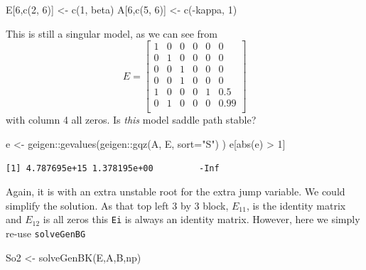 \documentclass[
  letterpaper,
]{book}
\newenvironment{Shaded}{\begin{snugshade}}{\end{snugshade}}
\newcommand{\AttributeTok}[1]{\textcolor[rgb]{0.40,0.45,0.13}{#1}}
\newcommand{\DecValTok}[1]{\textcolor[rgb]{0.68,0.00,0.00}{#1}}
\newcommand{\FunctionTok}[1]{\textcolor[rgb]{0.28,0.35,0.67}{#1}}
\newcommand{\NormalTok}[1]{\textcolor[rgb]{0.00,0.23,0.31}{#1}}
\newcommand{\OtherTok}[1]{\textcolor[rgb]{0.00,0.23,0.31}{#1}}
\newcommand{\SpecialCharTok}[1]{\textcolor[rgb]{0.37,0.37,0.37}{#1}}
\newcommand{\StringTok}[1]{\textcolor[rgb]{0.13,0.47,0.30}{#1}}
\begin{document}
\begin{Shaded}
\begin{Highlighting}[]
\NormalTok{E[}\DecValTok{6}\NormalTok{,}\FunctionTok{c}\NormalTok{(}\DecValTok{2}\NormalTok{, }\DecValTok{6}\NormalTok{)]     }\OtherTok{\textless{}{-}} \FunctionTok{c}\NormalTok{(}\DecValTok{1}\NormalTok{, beta)}
\NormalTok{A[}\DecValTok{6}\NormalTok{,}\FunctionTok{c}\NormalTok{(}\DecValTok{5}\NormalTok{, }\DecValTok{6}\NormalTok{)]     }\OtherTok{\textless{}{-}} \FunctionTok{c}\NormalTok{(}\SpecialCharTok{{-}}\NormalTok{kappa, }\DecValTok{1}\NormalTok{)}
\end{Highlighting}
\end{Shaded}

This is still a singular model, as we can see from \[  
E = \left[\begin{matrix}1 &0 &0 &0 &0 &0 \\0 &1 &0 &0 &0 &0 \\0 &0 &1 &0 &0 &0 \\0 &0 &1 &0 &0 &0 \\1 &0 &0 &0 &1 &0.5 \\0 &1 &0 &0 &0 &0.99 \\\end{matrix}\right] 
\] with column 4 all zeros. Is \emph{this} model saddle path stable?

\begin{Shaded}
\begin{Highlighting}[]
\NormalTok{e }\OtherTok{\textless{}{-}}\NormalTok{ geigen}\SpecialCharTok{::}\FunctionTok{gevalues}\NormalTok{(geigen}\SpecialCharTok{::}\FunctionTok{gqz}\NormalTok{(A, E, }\AttributeTok{sort=}\StringTok{"S"}\NormalTok{) )}
\NormalTok{e[}\FunctionTok{abs}\NormalTok{(e) }\SpecialCharTok{\textgreater{}} \DecValTok{1}\NormalTok{]}
\end{Highlighting}
\end{Shaded}

\begin{verbatim}
[1] 4.787695e+15 1.378195e+00         -Inf
\end{verbatim}

Again, it is with an extra unstable root for the extra jump variable. We
could simplify the solution. As that top left 3 by 3 block, \(E_{11}\),
is the identity matrix and \(E_{12}\) is all zeros this \texttt{Ei} is
always an identity matrix. However, here we simply re-use
\texttt{solveGenBG}

\begin{Shaded}
\begin{Highlighting}[]
\NormalTok{So2 }\OtherTok{\textless{}{-}} \FunctionTok{solveGenBK}\NormalTok{(E,A,B,np)}
\end{Highlighting}
\end{Shaded}
\end{document}
